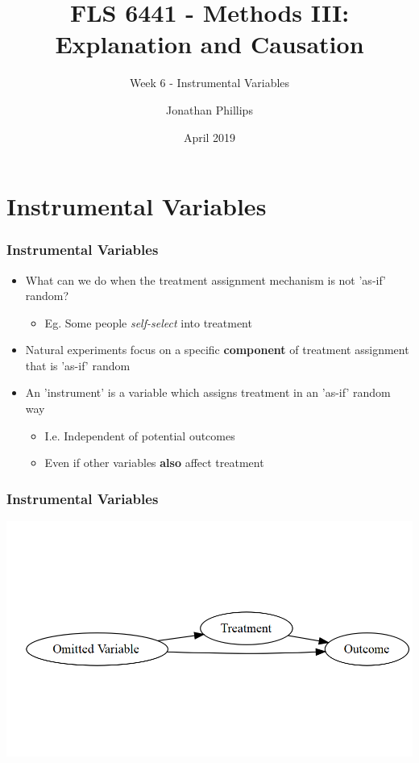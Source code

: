 \documentclass[xcolor=x11names,compress]{beamer}\usepackage[]{graphicx}\usepackage[]{color}
\title{FLS 6441 - Methods III: Explanation and Causation}
\subtitle{Week 6 - Instrumental Variables}
\author{Jonathan Phillips}
\date{April 2019}
\makeatletter
\def\maxwidth{ %
  \ifdim\Gin@nat@width>\linewidth
    \linewidth
  \else
    \Gin@nat@width
  \fi
}
\newenvironment{knitrout}{}{} %
\renewcommand{\(}{\begin{columns}}
\renewcommand{\)}{\end{columns}}
\newcommand{\<}[1]{\begin{column}{#1}}
\renewcommand{\>}{\end{column}}
\makeatother
\begin{document}
  

\frame{\titlepage}

\section{Instrumental Variables}

\begin{frame}
\frametitle{Instrumental Variables}
\begin{itemize}
\item What can we do when the treatment assignment mechanism is not 'as-if' random?
\pause
\begin{itemize}
\item Eg. Some people \textit{self-select} into treatment
\end{itemize}
\pause
\item Natural experiments focus on a specific \textbf{component} of treatment assignment that is 'as-if' random
\pause
\item An 'instrument' is a variable which assigns treatment in an 'as-if' random way
\pause
\begin{itemize}
\item I.e. Independent of potential outcomes
\pause
\item Even if other variables \textbf{also} affect treatment
\end{itemize}
\end{itemize}
\end{frame}

\begin{frame}
\frametitle{Instrumental Variables}
\begin{knitrout}
\color{fgcolor}
\includegraphics[width=\maxwidth]{figure/dag1-1} 

\end{knitrout}
\end{frame}
\end{document}
